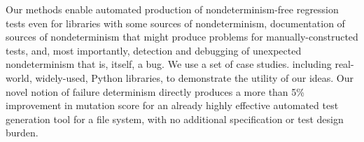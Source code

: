 \begin{comment}
Previous practical approaches to
nondeterminism/flaky test detection and debugging rely either on 1) identifying
potential sources of nondeterminism such as test inter-dependence
\cite{LamZE2015} or certain code smells \cite{palomba2017does}  or 2)
use a heuristic approach to mark failures as likely flaky, such as that taken by DeFlaker
\cite{bell2018d}.  In the real world, people usually detect flaky
tests by the most obvious heuristic of all:  they observe a test both
fail and pass for the same code version.  In a sense, even DeFlaker
relies on this method, but avoids having to observe a flaky test actually
passing, by inferring that if a test was previously passing, and
executes no changed code, its failure after a code change \emph{must}
be due to flakiness/nondeterminism.  Our approach to the problem is
fundamentally different, and essentially orthogonal; we concentrate on the detection and avoidance of
nondeterminism/flakiness using \emph{automated test generation},
and make it possible for a developer or test engineer to detect when
important values generated in automated testing differ without a
change in the test itself or the code under test.  While some of these
changes may be harmless, and unable to propagate to cause test
failures, they are potential sources of flaky behavior.  To our
knowledge, this is the first approach to the problem that
allows detection of (potential sources of) flakiness, based on real divergence in
behavior, without having to observe a test actually fail due to
nondeterminism.  we additionally introduce the first variation of
delta-debugging that properly handles probabilistic faults and
reduction properties.
\end{comment}

Our methods enable automated production of
nondeterminism-free regression tests even for libraries with some
sources of nondeterminism, documentation of sources of
nondeterminism that might produce problems for manually-constructed
tests, and, most importantly, detection and debugging of 
unexpected nondeterminism that is, itself, a bug.  We use a set
of case studies. including real-world, widely-used, Python libraries, to demonstrate the
utility of our ideas.  Our novel notion of failure determinism directly
produces a more than 5\% improvement in mutation score for an already highly
effective automated test generation tool for a file system, with no
additional specification or test design burden.